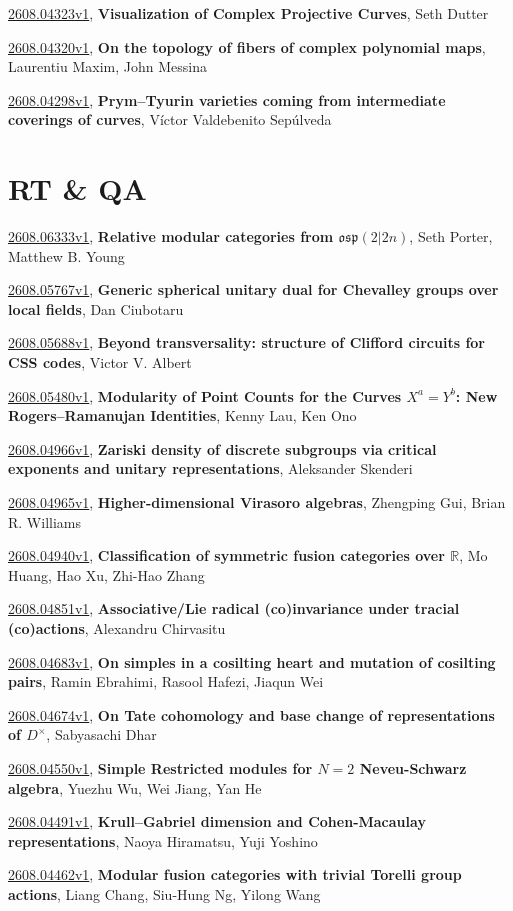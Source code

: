\documentclass[9pt, a4paper]{article}
\theoremstyle{plain}
\theoremstyle{definition}
\theoremstyle{remark}
\newcommand{\arxiv}[3]{\href{https://arxiv.org/abs/#1}{#1}, \textbf{\textcolor{arxivblue}{#2}}, #3}
\begin{document}
\arxiv{2608.04323v1}{Visualization of Complex Projective Curves}{Seth Dutter}

\arxiv{2608.04320v1}{On the topology of fibers of complex polynomial maps}{Laurentiu Maxim, John Messina}

\arxiv{2608.04298v1}{Prym--Tyurin varieties coming from intermediate coverings of curves}{Víctor Valdebenito Sepúlveda}


\section{RT \& QA}
\arxiv{2608.06333v1}{Relative modular categories from $\mathfrak{osp}(2 \vert 2n)$}{Seth Porter, Matthew B. Young}

\arxiv{2608.05767v1}{Generic spherical unitary dual for Chevalley groups over local fields}{Dan Ciubotaru}

\arxiv{2608.05688v1}{Beyond transversality: structure of Clifford circuits for CSS codes}{Victor V. Albert}

\arxiv{2608.05480v1}{Modularity of Point Counts for the Curves $X^a=Y^b$: New Rogers--Ramanujan Identities}{Kenny Lau, Ken Ono}

\arxiv{2608.04966v1}{Zariski density of discrete subgroups via critical exponents and unitary representations}{Aleksander Skenderi}

\arxiv{2608.04965v1}{Higher-dimensional Virasoro algebras}{Zhengping Gui, Brian R. Williams}

\arxiv{2608.04940v1}{Classification of symmetric fusion categories over $\mathbb{R}$}{Mo Huang, Hao Xu, Zhi-Hao Zhang}

\arxiv{2608.04851v1}{Associative/Lie radical (co)invariance under tracial (co)actions}{Alexandru Chirvasitu}

\arxiv{2608.04683v1}{On simples in a cosilting heart and mutation of cosilting pairs}{Ramin Ebrahimi, Rasool Hafezi, Jiaqun Wei}

\arxiv{2608.04674v1}{On Tate cohomology and base change of representations of $D^\times$}{Sabyasachi Dhar}

\arxiv{2608.04550v1}{Simple Restricted modules for $N=2$ Neveu-Schwarz algebra}{Yuezhu Wu, Wei Jiang, Yan He}

\arxiv{2608.04491v1}{Krull--Gabriel dimension and Cohen-Macaulay representations}{Naoya Hiramatsu, Yuji Yoshino}

\arxiv{2608.04462v1}{Modular fusion categories with trivial Torelli group actions}{Liang Chang, Siu-Hung Ng, Yilong Wang}
\end{document}

